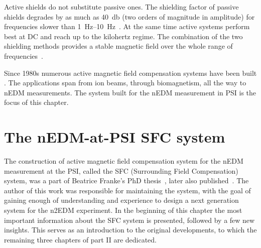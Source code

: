 Active shields do not substitute passive ones. The shielding factor
 of passive shields degrades by as much as \SI{40}{\decibel} (two orders of magnitude in amplitude) for frequencies slower than \SIrange[range-phrase = --]{1}{10}{\hertz}~\cite{Brake1991}. At the same time active systems perform best at DC and reach up to the kilohertz regime. The combination of the two shielding methods provides a stable magnetic field over the whole range of frequencies~\cite{Brake1991,Kelha1982,Voigt2013}.

Since 1980s numerous active magnetic field compensation systems have been built \cite{Kelha1982,Brake1991,Spemann2003,Brys2005,Kobayashi2012,Voigt2013,Afach2014}. The applications span from ion beams, through biomagnetism, all the way to nEDM measurements. The system built for the nEDM measurement in PSI is the focus of this chapter.




\section{The nEDM-at-PSI SFC system}
The construction of active magnetic field compensation system for the nEDM measurement at the PSI, called the SFC (Surrounding Field Compensation) system,
was a part of Beatrice Franke's PhD thesis~\cite{Franke2013}, later also published~\cite{Afach2014}. The author of this work was responsible for maintaining the system, with the goal of gaining enough of understanding and experience to design a next generation system for the n2EDM experiment. In the beginning of this chapter the most important information about the SFC system is presented, followed by a few new insights. This serves as an introduction to the original developments, to which the remaining three chapters of part II are dedicated.

